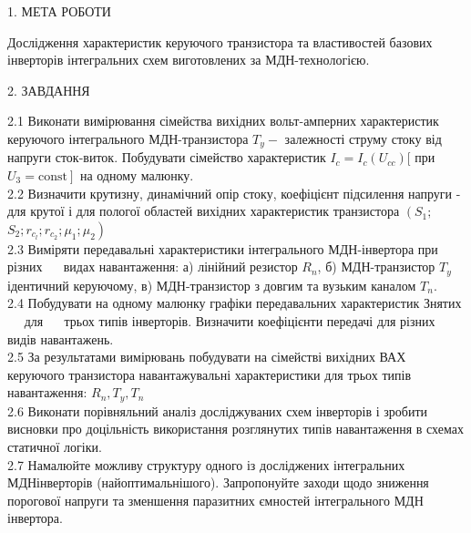 \documentclass[a4paper,14pt]{extreport}
\begin{document}
\begin{center}1. МЕТА РОБОТИ\\ \end{center}

Дослідження характеристик керуючого транзистора та властивостей
базових інверторів інтегральних схем виготовлених за МДН-технологією.

\begin{center}2. ЗАВДАННЯ\\ \end{center}

2.1 Виконати вимірювання сімейства вихідних вольт-амперних характеристик керуючого інтегрального МДН-транзистора $T_{y}-$ залежності струму стоку від напруги сток-виток. Побудувати сімейство характеристик $I_{c}=I_{c}\left(U_{c c}\right)[$ при $\left.U_{3}=\mathrm{const}\right]$ на одному малюнку.\\

2.2 Визначити крутизну, динамічний опір стоку, коефіцієнт підсилення напруги
- для крутої і для пологої областей вихідних характеристик транзистора $\left(S_{1} ;\right.$ $\left.S_{2} ; r_{c_l} ; r_{c_2} ; \mu_{1} ; \mu_{2}\right)$\\

2.3 Виміряти передавальні характеристики інтегрального МДН-інвертора при різних $\quad$ видах навантаження: а) лінійний резистор $R_{n}$, б) МДН-транзистор $T_{y}$ ідентичний керуючому, в) МДН-транзистор з довгим та вузьким каналом $T_{n} .$\\

2.4 Побудувати на одному малюнку графіки передавальних характеристик Знятих $\quad$ для $\quad$ трьох типів інверторів. Визначити коефіцієнти передачі для різних видів навантажень.\\

2.5 За результатами вимірювань побудувати на сімействі вихідних ВАХ керуючого транзистора навантажувальні характеристики для трьох типів навантаження: $R_{n}, T_{y}, T_{n}$\\


2.6 Виконати порівняльний аналіз досліджуваних схем інверторів і зробити висновки про доцільність використання розглянутих типів навантаження в схемах статичної логіки.\\

2.7 Намалюйте можливу структуру одного із досліджених інтегральних МДНінверторів (найоптимальнішого). Запропонуйте заходи щодо зниження порогової напруги та зменшення паразитних ємностей інтегрального МДН інвертора.\\
\end{document}
